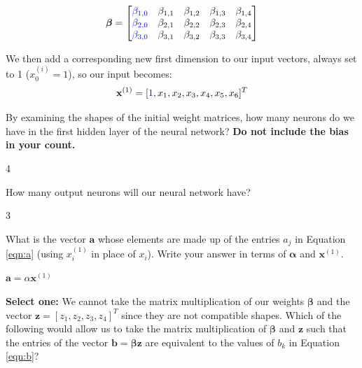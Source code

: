 \documentclass[11pt,addpoints,answers]{exam}
\newcommand{\av}{\mathbf{a}}
\newcommand{\bv}{\mathbf{b}}
\newcommand{\xv}{\mathbf{x}}
\newcommand{\zv}{\mathbf{z}}
\newcommand{\betav      }{\boldsymbol \beta      }
\begin{document}
\begin{questions}
\begin{parts}
$$\boldsymbol{\beta}=
    \begin{bmatrix}
    \textcolor{blue}{\beta_{1,0}} & \beta_{1,1} & \beta_{1,2} & \beta_{1,3} & \beta_{1,4} \\
    \textcolor{blue}{\beta_{2,0}} & \beta_{2,1} & \beta_{2,2} & \beta_{2,3} & \beta_{2,4} \\
    \textcolor{blue}{\beta_{3,0}} & \beta_{3,1} & \beta_{3,2} & \beta_{3,3} & \beta_{3,4}
    \end{bmatrix}$$

    We then add a corresponding new first dimension to our input vectors, always set to 1 ($x_0^{(i)} = 1$), so our input becomes: $$\xv^{(1)}=[\textcolor{blue}{1},x_1,x_2,x_3,x_4,x_5,x_6]^T$$
    
    
    \begin{subparts}
        \subpart[1] By examining the shapes of the initial weight matrices, how many neurons do we have in the first hidden layer of the neural network? \textbf{Do not include the bias in your count.}
        
        \begin{your_solution}[title=Answer,height=2cm,width=4cm]
        4
        \end{your_solution}

        \subpart[1] How many output neurons will our neural network have?
        
        \begin{your_solution}[title=Answer,height=2cm,width=4cm]
        3
        \end{your_solution}

        \subpart[1] What is the vector $\av$ whose elements are made up of the entries $a_j$ in Equation \ref{eqn:a} (using $x^{(1)}_i$ in place of $x_i$). Write your answer in terms of $\bm{\alpha}$ and $\xv^{(1)}$.
        
        \begin{your_solution}[title=Answer,height=2cm,width=4cm]
        $\mathbf{a} = \alpha \mathbf{x}^{(1)}$
        \end{your_solution}
        

        \clearpage

        \subpart[1] \textbf{Select one:} We cannot take the matrix multiplication of our weights $\betav$ and the vector $\zv = [z_1, z_2, z_3, z_4]^T$ since they are not compatible shapes. Which of the following would allow us to take the matrix multiplication of $\betav$ and $\zv$ such that the entries of the vector $\bv = \boldsymbol{\beta}\zv$ are equivalent to the values of $b_k$ in Equation \ref{eqn:b}? 
        

\end{subparts}
\end{parts}
\end{questions}
\end{document}
